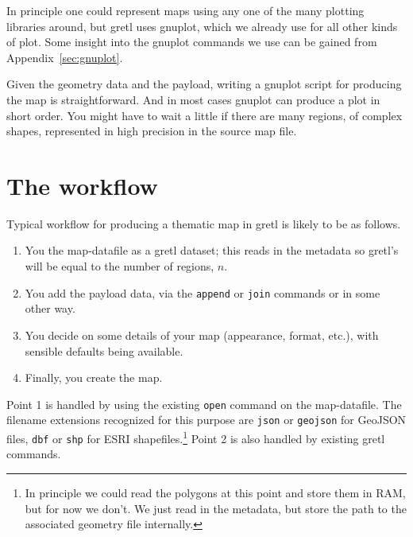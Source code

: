 \documentclass{article}
\begin{document}
In principle one could represent maps using any one of the many
plotting libraries around, but gretl uses \textsf{gnuplot}, which we
already use for all other kinds of plot. Some insight into the
\textsf{gnuplot} commands we use can be gained from
Appendix~\ref{sec:gnuplot}.

Given the geometry data and the payload, writing a \textsf{gnuplot}
script for producing the map is straightforward. And in most cases
\textsf{gnuplot} can produce a plot in short order. You might have to
wait a little if there are many regions, of complex shapes,
represented in high precision in the source map file.

\section{The workflow}
\label{sec:workflow}

Typical workflow for producing a thematic map in gretl is likely to be
as follows.

\begin{enumerate}
\item You  the map-datafile as a gretl dataset; this reads
  in the metadata so gretl's  will be equal to the number
  of regions, $n$.
\item You add the payload data, via the \texttt{append} or
  \texttt{join} commands or in some other way.
\item You decide on some details of your map (appearance, format,
  etc.), with sensible defaults being available.
\item Finally, you create the map.
\end{enumerate}

Point 1 is handled by using the existing \texttt{open} command on the
map-datafile. The filename extensions recognized for this purpose are
\texttt{json} or \texttt{geojson} for GeoJSON files, \texttt{dbf} or
\texttt{shp} for ESRI shapefiles.\footnote{In principle we could read
  the polygons at this point and store them in RAM, but for now we
  don't. We just read in the metadata, but store the path to the
  associated geometry file internally.} Point 2 is also handled by
existing gretl commands.
\end{document}
